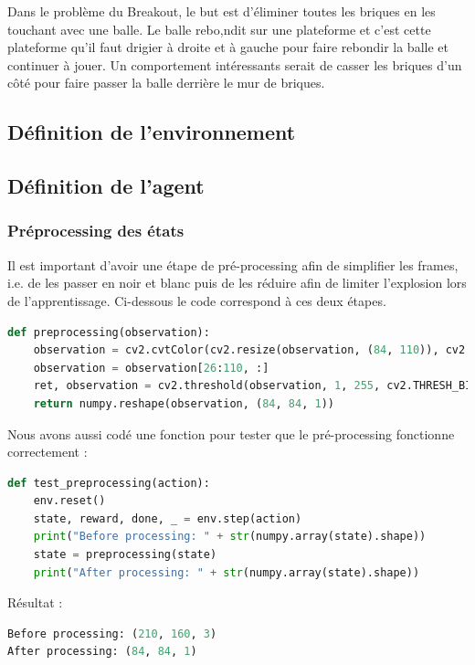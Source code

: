 \documentclass[10pt,a4paper]{article}
\begin{document}
Dans le problème du Breakout, le but est d'éliminer toutes les briques en les touchant avec une balle. Le balle rebo,ndit sur une plateforme et c'est cette plateforme qu'il faut drigier à droite et à gauche pour faire rebondir la balle et continuer à jouer. Un comportement intéressants serait de casser les briques d'un côté pour faire passer la balle derrière le mur de briques. 

\subsection{Définition de l'environnement}

\subsection{Définition de l'agent}

\subsubsection{Préprocessing des états}

Il est important d'avoir une étape de pré-processing afin de \og simplifier \fg{} les frames, i.e. de les passer en noir et blanc puis de les réduire afin de limiter l'explosion lors de l'apprentissage. Ci-dessous le code correspond à ces deux étapes.

\begin{lstlisting}[language=Python,caption=Préprocessing des états]
def preprocessing(observation):
    observation = cv2.cvtColor(cv2.resize(observation, (84, 110)), cv2.COLOR_BGR2GRAY)
    observation = observation[26:110, :]
    ret, observation = cv2.threshold(observation, 1, 255, cv2.THRESH_BINARY)
    return numpy.reshape(observation, (84, 84, 1))
\end{lstlisting}

Nous avons aussi codé une fonction pour tester que le pré-processing fonctionne correctement :

\begin{lstlisting}[language=Python,caption=Test du préprocessing des états]
def test_preprocessing(action):
    env.reset()
    state, reward, done, _ = env.step(action)
    print("Before processing: " + str(numpy.array(state).shape))
    state = preprocessing(state)
    print("After processing: " + str(numpy.array(state).shape))
\end{lstlisting}
Résultat :
\begin{lstlisting}[language=Python]
Before processing: (210, 160, 3)
After processing: (84, 84, 1)
\end{lstlisting}
\end{document}
